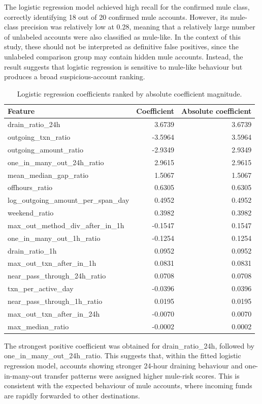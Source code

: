 The logistic regression model achieved high recall for the confirmed mule class, correctly identifying 18 out of 20 confirmed mule accounts. However, its mule-class precision was relatively low at 0.28, meaning that a relatively large number of unlabeled accounts were also classified as mule-like. In the context of this study, these should not be interpreted as definitive false positives, since the unlabeled comparison group may contain hidden mule accounts. Instead, the result suggests that logistic regression is sensitive to mule-like behaviour but produces a broad suspicious-account ranking.
\begin{table}[H]
\centering
\begin{tabular}{lrr}
\hline
Feature & Coefficient & Absolute coefficient \\
\hline
drain\_ratio\_24h & 3.6739 & 3.6739 \\
outgoing\_txn\_ratio & -3.5964 & 3.5964 \\
outgoing\_amount\_ratio & -2.9349 & 2.9349 \\
one\_in\_many\_out\_24h\_ratio & 2.9615 & 2.9615 \\
mean\_median\_gap\_ratio & 1.5067 & 1.5067 \\
offhours\_ratio & 0.6305 & 0.6305 \\
log\_outgoing\_amount\_per\_span\_day & 0.4952 & 0.4952 \\
weekend\_ratio & 0.3982 & 0.3982 \\
max\_out\_method\_div\_after\_in\_1h & -0.1547 & 0.1547 \\
one\_in\_many\_out\_1h\_ratio & -0.1254 & 0.1254 \\
drain\_ratio\_1h & 0.0952 & 0.0952 \\
max\_out\_txn\_after\_in\_1h & 0.0831 & 0.0831 \\
near\_pass\_through\_24h\_ratio & 0.0708 & 0.0708 \\
txn\_per\_active\_day & -0.0396 & 0.0396 \\
near\_pass\_through\_1h\_ratio & 0.0195 & 0.0195 \\
max\_out\_txn\_after\_in\_24h & -0.0070 & 0.0070 \\
max\_median\_ratio & -0.0002 & 0.0002 \\
\hline
\end{tabular}
\caption{Logistic regression coefficients ranked by absolute coefficient magnitude.}
\label{tab:logistic_feature_importance}
\end{table}
The strongest positive coefficient was obtained for drain\_ratio\_24h, followed by one\_in\_many\_out\_24h\_ratio. This suggests that, within the fitted logistic regression model, accounts showing stronger 24-hour draining behaviour and one-in-many-out transfer patterns were assigned higher mule-risk scores. This is consistent with the expected behaviour of mule accounts, where incoming funds are rapidly forwarded to other destinations.

